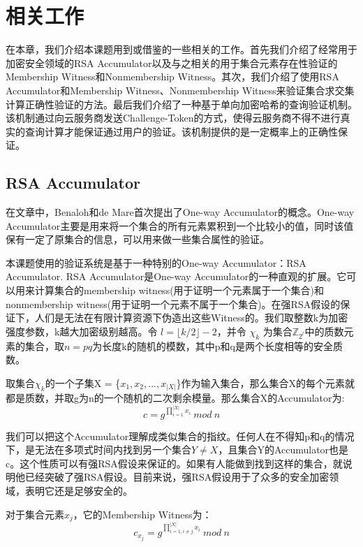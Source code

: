 \chapter{相关工作}
\label{chap:relatedwork}
在本章，我们介绍本课题用到或借鉴的一些相关的工作。首先我们介绍了经常用于加密安全领域的RSA Accumulator以及与之相关的用于集合元素存在性验证的Membership Witness和Nonmembership Witness。其次，我们介绍了使用RSA Accumulator和Membership Witness、Nonmembership Witness来验证集合求交集计算正确性验证的方法。最后我们介绍了一种基于单向加密哈希的查询验证机制。该机制通过向云服务商发送Challenge-Token的方式，使得云服务商不得不进行真实的查询计算才能保证通过用户的验证。该机制提供的是一定概率上的正确性保证。

\section{RSA Accumulator}
在文章\cite{benaloh1994one}中，Benaloh和de Mare首次提出了One-way Accumulator的概念。One-way Accumulator主要是用来将一个集合的所有元素累积到一个比较小的值，同时该值保有一定了原集合的信息，可以用来做一些集合属性的验证。

本课题使用的验证系统是基于一种特别的One-way Accumulator：RSA Accumulator.
RSA Accumulator是One-way Accumulator的一种直观的扩展。它可以用来计算集合的membership witness(用于证明一个元素属于一个集合)和nonmembership witness(用于证明一个元素不属于一个集合)。在强RSA假设的保证下，人们是无法在有限计算资源下伪造出这些Witness的。我们取整数k为加密强度参数，k越大加密级别越高。令 $l = \lfloor k/2 \rfloor - 2$，并令 $\chi_k$ 为集合$\mathbb{Z}_{2^l}$中的质数元素的集合，取$n = pq$为长度k的随机的模数，其中p和q是两个长度相等的安全质数。

取集合$\chi_k$的一个子集X = \{$x_1, x_2, ... , x_{|X|}$\}作为输入集合，那么集合X的每个元素就都是质数，并取g为n的一个随机的二次剩余模量。那么集合X的Accumulator为:
\begin{equation} c = g^{\prod_{i = 1}^{|X|} x_i}\ mod\ n \end{equation}

我们可以把这个Accumulator理解成类似集合的指纹。任何人在不得知p和q的情况下，是无法在多项式时间内找到另一个集合$Y \neq X$，且集合Y的Accumulator也是c。这个性质可以有强RSA假设来保证的。如果有人能做到找到这样的集合，就说明他已经突破了强RSA假设。目前来说，强RSA假设用于了众多的安全加密领域，表明它还是足够安全的。

对于集合元素$x_j$，它的Membership Witness为：
\begin{equation} \label{eq:sw} c_{x_j} = g^{\prod_{i=1, i \ne j}^{|X|} x_i}\ mod\ n \end{equation}

